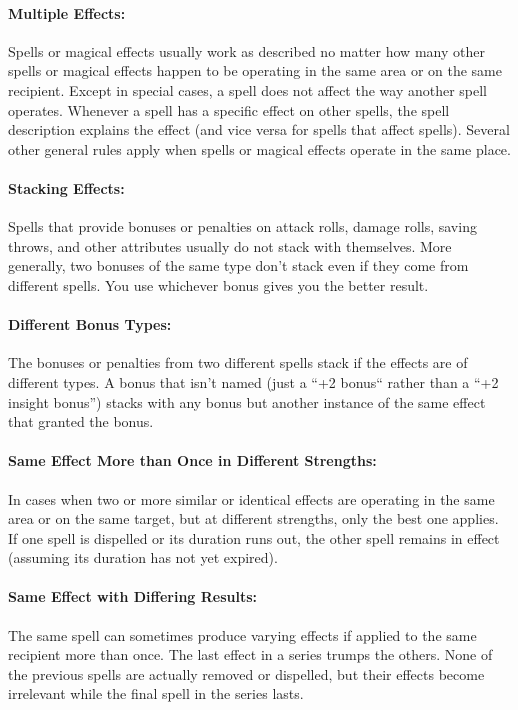 \paragraph{Multiple Effects:} Spells or magical effects usually work as described no matter how many other spells or magical effects happen to be operating in the same area or on the same recipient. 
Except in special cases, a spell does not affect the way another spell operates. 
Whenever a spell has a specific effect on other spells, the spell description explains the effect (and vice versa for spells that affect spells). 
Several other general rules apply when spells or magical effects operate in the same place.

\paragraph{Stacking Effects:} Spells that provide bonuses or penalties on attack rolls, damage rolls, saving throws, and other attributes usually do not stack with themselves. 
More generally, two bonuses of the same type don't stack even if they come from different spells. 
You use whichever bonus gives you the better result. 

\paragraph{Different Bonus Types:} The bonuses or penalties from two different spells stack if the effects are of different types. 
A bonus that isn't named (just a ``+2 bonus`` rather than a ``+2 insight bonus'') stacks with any bonus but another instance of the same effect that granted the bonus.

\paragraph{Same Effect More than Once in Different Strengths:} 
In cases when two or more similar or identical effects are operating in the same area or on the same target, but at different strengths, only the best one applies. 
If one spell is dispelled or its duration runs out, the other spell remains in effect (assuming its duration has not yet expired).

\paragraph{Same Effect with Differing Results:} 
The same spell can sometimes produce varying effects if applied to the same recipient more than once. 
The last effect in a series trumps the others. 
None of the previous spells are actually removed or dispelled, but their effects become irrelevant while the final spell in the series lasts.

